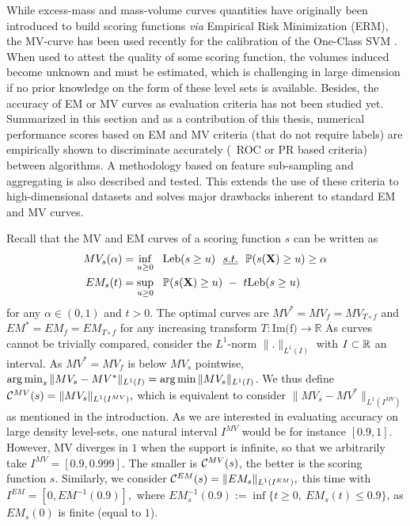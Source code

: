 While excess-mass and mass-volume curves quantities have originally been introduced to build scoring functions \emph{via}
Empirical Risk Minimization (ERM), the MV-curve has been used recently for the calibration of the One-Class SVM \citep{Thomas2015}.
When used to attest the quality of some scoring function, the volumes induced become unknown and must be estimated, which is challenging in large dimension if no prior knowledge on the form of these level sets is available.
%
Besides, the accuracy of EM or MV curves as evaluation criteria has not been studied yet.
%
Summarized in this section and as a contribution of this thesis, numerical performance scores based on EM and MV criteria (that do not require labels) are empirically shown to discriminate accurately (\wrt~ROC or PR based criteria) between algorithms.
A methodology based on feature sub-sampling and aggregating is also described and tested. This extends the use of these criteria to high-dimensional datasets and solves major drawbacks inherent to standard EM and MV curves.

Recall that the MV and EM curves of a scoring function $s$ can be written as
\noindent
\begin{align}
\label{intro:MV-def}
 MV_s(\alpha) &= \inf_{u \ge 0}~~ \text{Leb}(s \ge u) ~~\emph{s.t.}{}~~\mathbb{P}(s(\mathbf X) \ge u) \ge \alpha\\
\label{intro:EM-def}
 EM_s(t) &= \sup_{u \ge 0}~~ \mathbb{P}(s(\mathbf X) \ge u) ~-~ t \text{Leb}(s \ge u)
\end{align}
for any $\alpha\in (0,1)$ and $t >0$.
%
The optimal curves are $MV^* = MV_f = MV_{T \circ f}$ and $EM^* = EM_f = EM_{T \circ f}$ for any increasing transform $T: \text{Im(f)} \to \mathbb{R}$
%
As curves cannot be trivially compared, consider the $L^1$-norm $\|.\|_{L^1(I)}$ with $I\subset \mathbb{R}$ an interval. As $MV^*=MV_f$ is below $MV_s$ pointwise, $\argmin_s \| MV_s - MV^* \|_{L^1(I)} = \argmin \| MV_s \|_{L^1(I)} $. We thus define
$\mathcal{C}^{MV}(s) = \| MV_s \|_{L^1(I^{MV})},$ which is equivalent to consider $\| MV_s - MV^* \|_{L^1(I^{MV})}$ as mentioned in the introduction. As we are interested in evaluating accuracy on large density level-sets, one natural interval $I^{MV}$ would be for instance $[0.9, 1]$. However, MV diverges in $1$ when the support is infinite, so that we arbitrarily take $I^{MV} = [0.9, 0.999].$
The smaller is $\mathcal{C}^{MV}(s)$, the better is the scoring function $s$.
%
Similarly, we consider $\mathcal{C}^{EM}(s) = \| EM_s \|_{L^1(I^{EM})}, $ this time with $I^{EM} = [0,EM^{-1}(0.9)],$ where $EM_s^{-1}(0.9) := \inf\{t\ge 0,~ EM_s(t) \le 0.9\}$, as $EM_s(0)$ is finite (equal to $1$). %


